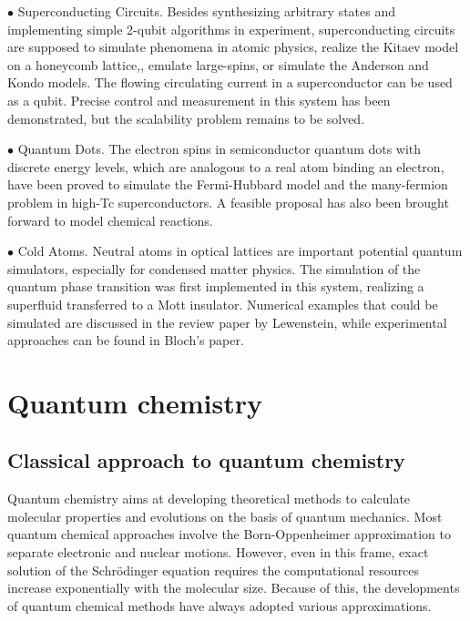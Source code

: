 \documentclass[8.5pt,twoside,twocolumn]{article}
\begin{document}
$\bullet$ Superconducting Circuits. Besides synthesizing arbitrary states and implementing simple 2-qubit algorithms in experiment,\cite{Super_1,Super_2} superconducting circuits are supposed to simulate phenomena in atomic physics,\cite{Super_3,Super_4} realize the Kitaev model on a honeycomb lattice,\cite{Super_5}, emulate large-spins,\cite{Super_10} or simulate the Anderson and Kondo models.\cite{Super_6,Super_11} The flowing circulating current in a superconductor can be used as a qubit.\cite{Super_7,Super_4,Super_8,Super_9} Precise control and measurement in this system has been demonstrated, but the scalability problem remains to be solved.

$\bullet$ Quantum Dots. The electron spins in semiconductor quantum dots with discrete energy levels,\cite{Dot_1} which are analogous to a real atom binding an electron, have been proved to simulate the Fermi-Hubbard model\cite{Dot_1,Dot_2} and the many-fermion problem in high-Tc superconductors.\cite{AQS_2} A feasible proposal has also been brought forward to model chemical reactions.\cite{AQS_3}

$\bullet$ Cold Atoms. Neutral atoms in optical lattices are important potential quantum simulators, especially for condensed matter physics. The simulation of the quantum phase transition was first implemented in this system, realizing a superfluid transferred to a Mott insulator.\cite{AQS_1} Numerical examples that could be simulated are discussed in the review paper by Lewenstein,\cite{Lewensitein} while experimental approaches can be found in Bloch's paper.\cite{Cold_1}

\section{Quantum chemistry}

\subsection{Classical approach to quantum chemistry}

Quantum chemistry aims at developing theoretical methods
to calculate molecular properties and evolutions
on the basis of quantum mechanics. Most quantum chemical approaches
involve the Born-Oppenheimer approximation to separate
electronic and nuclear motions. However, even in this frame,
exact solution of the Schr\"{o}dinger equation
requires the computational resources increase exponentially
with the molecular size. Because of this, the developments of
quantum chemical methods have always
adopted various approximations.
\end{document}
